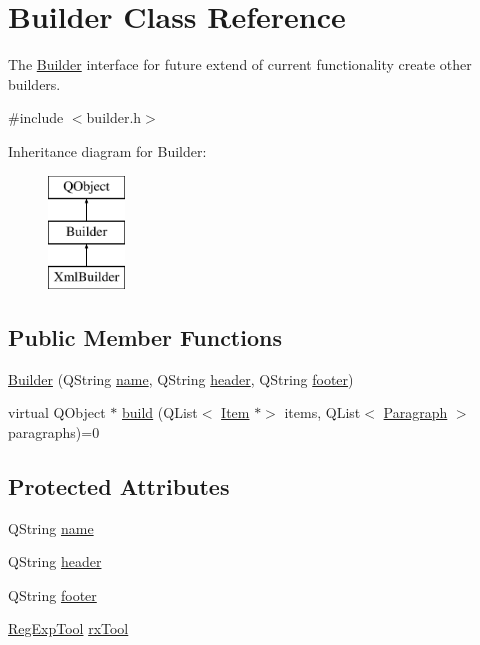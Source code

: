 \hypertarget{class_builder}{}\section{Builder Class Reference}
\label{class_builder}


The \hyperlink{class_builder}{Builder} interface for future extend of current functionality create other builders.  




{\ttfamily \#include $<$builder.\+h$>$}

Inheritance diagram for Builder\+:\begin{figure}[H]
\begin{center}
\leavevmode
\includegraphics[height=3.000000cm]{class_builder}
\end{center}
\end{figure}
\subsection*{Public Member Functions}
\begin{DoxyCompactItemize}
\item 
\hyperlink{class_builder_a90a875243096a42ca4069258c52a1ad4}{Builder} (Q\+String \hyperlink{class_builder_ad8ac906f8ce85ebcd061c4ee8e6f6a01}{name}, Q\+String \hyperlink{class_builder_ae3800e384b079c2d66ab4d8f98cbb4ad}{header}, Q\+String \hyperlink{class_builder_a5ace791b99eb11341d6f39e35fdd2ce7}{footer})
\item 
virtual Q\+Object $\ast$ \hyperlink{class_builder_a92d31ffc3502acebf0cd074e8b084751}{build} (Q\+List$<$ \hyperlink{class_item}{Item} $\ast$$>$ items, Q\+List$<$ \hyperlink{class_paragraph}{Paragraph} $>$ paragraphs)=0
\end{DoxyCompactItemize}
\subsection*{Protected Attributes}
\begin{DoxyCompactItemize}
\item 
Q\+String \hyperlink{class_builder_ad8ac906f8ce85ebcd061c4ee8e6f6a01}{name}
\item 
Q\+String \hyperlink{class_builder_ae3800e384b079c2d66ab4d8f98cbb4ad}{header}
\item 
Q\+String \hyperlink{class_builder_a5ace791b99eb11341d6f39e35fdd2ce7}{footer}
\item 
\hyperlink{class_reg_exp_tool}{Reg\+Exp\+Tool} \hyperlink{class_builder_a87575206ceba9ffc2d5c70c5800fff18}{rx\+Tool}
\end{DoxyCompactItemize}


